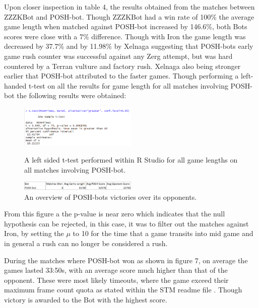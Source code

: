 \documentclass[journal]{IEEEtran}
\begin{document}
	Upon closer inspection in table 4, the results obtained from the matches between ZZZKBot and POSH-bot. Though ZZZKBot had a win rate of 100\% the average game length when matched against POSH-bot increased by 146.6\%, both Bots scores were close with a 7\% difference. Though with Iron the game length was decreased by 37.7\% and by 11.98\% by Xelnaga suggesting that POSH-bots early game rush counter was successful against any Zerg attempt, but was hard countered by a Terran vulture and factory rush. Xelnaga also being stronger earlier that POSH-bot attributed to the faster games. Though performing a left-handed t-test on all the results for game length for all matches involving POSH-bot the following results were obtained:
	
	\begin{figure}[H]
		\centering
		\includegraphics[width=0.5\textwidth]{RPoshTimeLeft}
		\caption{A left sided t-test performed within R Studio for all game lengths on all matches involving POSH-bot.}
		\label{Fig5}
		\centering
		\includegraphics[width=0.5\textwidth]{PoshWinsandScore}
		\caption{An overview of POSH-bots victories over its opponents.}
		\label{poshonly}
	\end{figure}
	
	From this figure a the p-value is near zero which indicates that the null hypothesis can be rejected, in this case, it was to filter out the matches against Iron, by setting the $\mu$ to 10 for the time that a game transits into mid game and in general a rush can no longer be considered a rush. 
	
	During the matches where POSH-bot won as shown in figure 7, on average the games lasted 33:50s, with an average score much higher than that of the opponent. These were most likely timeouts, where the game exceed their maximum frame count quota as stated within the STM readme file \cite{Tournament}. Though victory is awarded to the Bot with the highest score.
		
\end{document}
